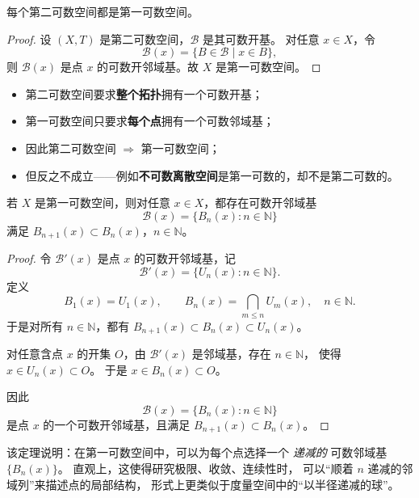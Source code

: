 \begin{theorem}
每个第二可数空间都是第一可数空间。
\end{theorem}

\begin{proof}
设 $(X,T)$ 是第二可数空间，$\mathcal{B}$ 是其可数开基。  
对任意 $x\in X$，令
\[
\mathcal{B}(x)=\{B\in\mathcal{B}\mid x\in B\},
\]
则 $\mathcal{B}(x)$ 是点 $x$ 的可数开邻域基。故 $X$ 是第一可数空间。
\end{proof}

\begin{remark}[区别与关系]
\begin{itemize}
  \item 第二可数空间要求\textbf{整个拓扑}拥有一个可数开基；
  \item 第一可数空间只要求\textbf{每个点}拥有一个可数邻域基；
  \item 因此第二可数空间 $\Rightarrow$ 第一可数空间；
  \item 但反之不成立——例如\textbf{不可数离散空间}是第一可数的，却不是第二可数的。
\end{itemize}
\end{remark}
\begin{theorem}
若 $X$ 是第一可数空间，则对任意 $x\in X$，都存在可数开邻域基
\[
\mathcal{B}(x)=\{B_n(x):n\in\mathbb{N}\}
\]
满足 $B_{n+1}(x)\subset B_n(x)$，$n\in\mathbb{N}$。
\end{theorem}

\begin{proof}
令 $\mathcal{B}'(x)$ 是点 $x$ 的可数开邻域基，记
\[
\mathcal{B}'(x)=\{U_n(x):n\in\mathbb{N}\}.
\]
定义
\[
B_1(x)=U_1(x), \qquad
B_n(x)=\bigcap_{m\le n}U_m(x),\quad n\in\mathbb{N}.
\]
于是对所有 $n\in\mathbb{N}$，都有 $B_{n+1}(x)\subset B_n(x)\subset U_n(x)$。

对任意含点 $x$ 的开集 $O$，由 $\mathcal{B}'(x)$ 是邻域基，存在 $n\in\mathbb{N}$，
使得 $x\in U_n(x)\subset O$。
于是 $x\in B_n(x)\subset O$。

因此
\[
\mathcal{B}(x)=\{B_n(x):n\in\mathbb{N}\}
\]
是点 $x$ 的一个可数开邻域基，且满足 $B_{n+1}(x)\subset B_n(x)$。
\end{proof}
\begin{remark}
该定理说明：在第一可数空间中，可以为每个点选择一个
\emph{递减的} 可数邻域基 $\{B_n(x)\}$。
直观上，这使得研究极限、收敛、连续性时，
可以“顺着 $n$ 递减的邻域列”来描述点的局部结构，
形式上更类似于度量空间中的“以半径递减的球”。
\end{remark}
